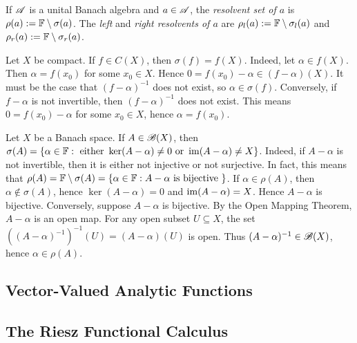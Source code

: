 \documentclass[reqno]{amsart}
\begin{document}
\begin{definition}
	If $\mathscr{A}$ is a unital Banach algebra and $a \in \mathscr{A}$, the \emph{resolvent set of $a$} is $\rho(a) := \mathbb{F} \setminus \sigma(a)$. The \emph{left} and \emph{right resolvents of $a$} are $\rho_l(a) := \mathbb{F} \setminus \sigma_l(a)$ and $\rho_r(a) := \mathbb{F} \setminus \sigma_r(a)$.
\end{definition}

\begin{example}
	Let $X$ be compact. If $f \in C(X)$, then $\sigma(f) = f(X)$. Indeed, let $\alpha \in f(X)$. Then $\alpha = f(x_0)$ for some $x_0 \in X$. Hence $0 = f(x_0) - \alpha \in (f-\alpha)(X)$. It must be the case that $(f-\alpha)^{-1}$ does not exist, so $\alpha \in \sigma(f)$. Conversely, if $f-\alpha$ is not invertible, then $(f-\alpha)^{-1}$ does not exist. This means $0 = f(x_0) - \alpha$ for some $x_0 \in X$, hence $\alpha = f(x_0)$. 
\end{example}

\begin{example}
	Let $X$ be a Banach space. If $A \in \mathscr{B}(X)$, then $\sigma(A) = \{\alpha \in \mathbb{F} : \text{ either }\ker(A-\alpha) \neq 0\text{ or }\operatorname{im}(A-\alpha) \neq X\}$. Indeed, if $A - \alpha$ is not invertible, then it is either not injective or not surjective. In fact, this means that $\rho(A) = \mathbb{F} \setminus \sigma(A) = \{\alpha \in \mathbb{F} : A - \alpha \text{ is bijective }\}$. If $\alpha \in \rho(A)$, then $\alpha \not\in \sigma(A)$, hence $\ker(A - \alpha) = 0$ and $\operatorname{im}(A - \alpha) = X$. Hence $A - \alpha$ is bijective. Conversely, suppose $A - \alpha$ is bijective. By the Open Mapping Theorem, $A-\alpha$ is an open map. For any open subset $U \subseteq X$, the set $((A-\alpha)^{-1})^{-1}(U) = (A-\alpha)(U)$ is open. Thus $(A-\alpha)^{-1} \in \mathscr{B}(X)$, hence $\alpha \in \rho(A)$.
\end{example}

\subsection{Vector-Valued Analytic Functions}

\subsection{The Riesz Functional Calculus}
\end{document}
